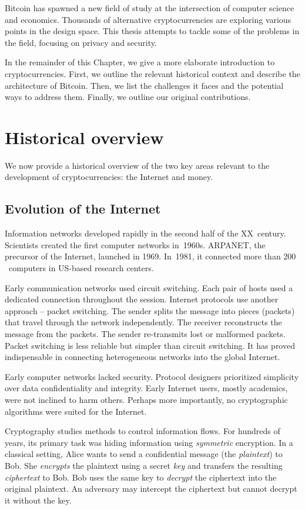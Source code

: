 Bitcoin has spawned a new field of study at the intersection of computer science and economics.
Thousands of alternative cryptocurrencies are exploring various points in the design space.
This thesis attempts to tackle some of the problems in the field, focusing on privacy and security.

In the remainder of this Chapter, we give a more elaborate introduction to cryptocurrencies.
First, we outline the relevant historical context and describe the architecture of Bitcoin.
Then, we list the challenges it faces and the potential ways to address them.
Finally, we outline our original contributions.


\section{Historical overview}

We now provide a historical overview of the two key areas relevant to the development of cryptocurrencies: the Internet and money.

\subsection{Evolution of the Internet}

Information networks developed rapidly in the second half of the XX~century.
Scientists created the first computer networks in~1960s.
ARPANET, the precursor of the Internet, launched in 1969.
In~1981, it connected more than $200$~computers in US-based research centers.

Early communication networks used circuit switching.
Each pair of hosts used a dedicated connection throughout the session.
Internet protocols use another approach -- packet switching.
The sender splits the message into pieces (packets) that travel through the network independently.
The receiver reconstructs the message from the packets.
The sender re-transmits lost or malformed packets.
Packet switching is less reliable but simpler than circuit switching.
It has proved indispensable in connecting heterogeneous networks into the global Internet.

Early computer networks lacked security.
Protocol designers prioritized simplicity over data confidentiality and integrity.
Early Internet users, mostly academics, were not inclined to harm others.
Perhaps more importantly, no cryptographic algorithms were suited for the Internet.

Cryptography studies methods to control information flows.
For hundreds of years, its primary task was hiding information using \textit{symmetric} encryption.
In a classical setting, Alice wants to send a confidential message (the \textit{plaintext}) to Bob.
She \textit{encrypts} the plaintext using a secret \textit{key} and transfers the resulting \textit{ciphertext} to Bob.
Bob uses the same key to \textit{decrypt} the ciphertext into the original plaintext.
An adversary may intercept the ciphertext but cannot decrypt it without the key.

